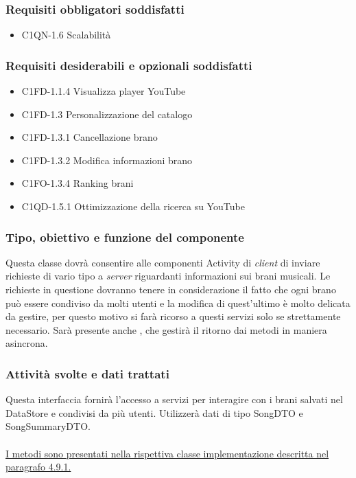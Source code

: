 \subsubsection*{Requisiti obbligatori soddisfatti}
\begin{itemize}
	\item C1QN-1.6 Scalabilit\`a
\end{itemize}
\subsubsection*{Requisiti desiderabili e opzionali soddisfatti}
\begin{itemize}
    \item C1FD-1.1.4 Visualizza player YouTube
    \item C1FD-1.3 Personalizzazione del catalogo
    \item C1FD-1.3.1 Cancellazione brano
    \item C1FD-1.3.2 Modifica informazioni brano
    \item C1FO-1.3.4 Ranking brani
    \item C1QD-1.5.1 Ottimizzazione della ricerca su YouTube
\end{itemize}
\subsubsection*{Tipo, obiettivo e funzione del componente}
Questa classe dovr\`a consentire alle componenti Activity di \emph{client} di
inviare richieste di vario tipo a \emph{server} riguardanti informazioni sui
brani musicali. Le richieste in questione dovranno tenere in considerazione il
fatto che ogni brano pu\`o essere condiviso da molti utenti e la modifica di
quest'ultimo \`e molto delicata da gestire, per questo motivo si far\`a ricorso a
questi servizi solo se strettamente necessario. Sar\`a presente anche
, che gestir\`a il ritorno dai metodi in maniera asincrona.
\subsubsection*{Attivit\`a svolte e dati trattati}
Questa interfaccia fornir\`a l'accesso a servizi per interagire con i brani
salvati nel DataStore e condivisi da pi\`u utenti. Utilizzer\`a dati di tipo
SongDTO e SongSummaryDTO.\\\\ \underline{I metodi sono presentati nella
rispettiva classe implementazione descritta nel paragrafo 4.9.1.}

